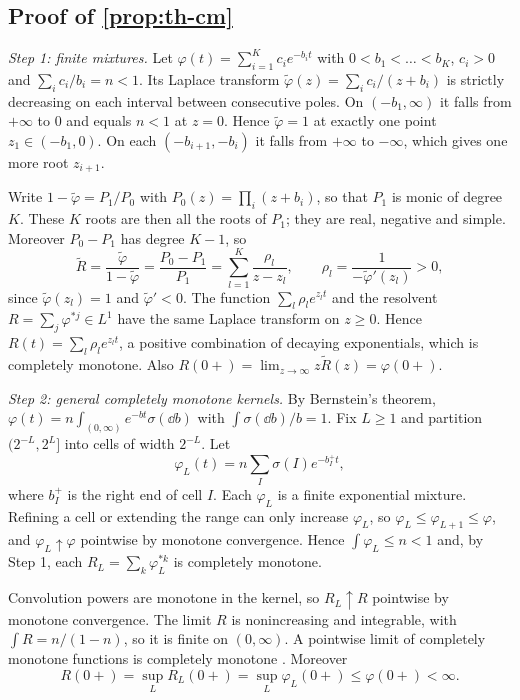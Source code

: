 \subsection{Proof of \texorpdfstring{\cref{prop:th-cm}}{Proposition (CM kernels)}}

\emph{Step 1: finite mixtures.} Let $\varphi(t)=\sum_{i=1}^Kc_ie^{-b_it}$ with
$0<b_1<\dots<b_K$, $c_i>0$ and $\sum_ic_i/b_i=n<1$. Its Laplace transform
$\tilde\varphi(z)=\sum_ic_i/(z+b_i)$ is strictly decreasing on each interval between
consecutive poles. On $(-b_1,\infty)$ it falls from $+\infty$ to $0$ and equals $n<1$
at $z=0$. Hence $\tilde\varphi=1$ at exactly one point $z_1\in(-b_1,0)$. On each
$(-b_{i+1},-b_i)$ it falls from $+\infty$ to $-\infty$, which gives one more root
$z_{i+1}$.

Write $1-\tilde\varphi=P_1/P_0$ with $P_0(z)=\prod_i(z+b_i)$, so that $P_1$ is monic of
degree $K$. These $K$ roots are then all the roots of $P_1$; they are real, negative and simple.
Moreover $P_0-P_1$ has degree $K-1$, so
\[
\tilde R=\frac{\tilde\varphi}{1-\tilde\varphi}=\frac{P_0-P_1}{P_1}
=\sum_{l=1}^K\frac{\rho_l}{z-z_l},\qquad
\rho_l=\frac{1}{-\tilde\varphi'(z_l)}>0,
\]
since $\tilde\varphi(z_l)=1$ and $\tilde\varphi'<0$. The function
$\sum_l\rho_le^{z_lt}$ and the resolvent $R=\sum_j\varphi^{*j}\in L^1$ have the same
Laplace transform on $z\ge0$. Hence $R(t)=\sum_l\rho_le^{z_lt}$, a positive combination of
decaying exponentials, which is completely monotone. Also
$R(0+)=\lim_{z\to\infty}z\tilde R(z)=\varphi(0+)$.

\emph{Step 2: general completely monotone kernels.} By Bernstein's theorem,
$\varphi(t)=n\int_{(0,\infty)}e^{-bt}\sigma(\dd b)$ with $\int\sigma(\dd b)/b=1$. Fix
$L\ge1$ and partition $(2^{-L},2^L]$ into cells of width $2^{-L}$. Let
\[
\varphi_L(t)=n\sum_I\sigma(I)e^{-b_I^+t},
\]
where $b_I^+$ is the right end of cell $I$. Each $\varphi_L$ is a finite exponential
mixture. Refining a cell or extending the range can only increase $\varphi_L$, so
$\varphi_L\le\varphi_{L+1}\le\varphi$, and $\varphi_L\uparrow\varphi$ pointwise by
monotone convergence. Hence $\int\varphi_L\le n<1$ and, by Step 1, each
$R_L=\sum_k\varphi_L^{*k}$ is completely monotone.

Convolution powers are monotone in the kernel, so $R_L\uparrow R$ pointwise by monotone
convergence. The limit $R$ is nonincreasing and integrable, with $\int R=n/(1-n)$, so it
is finite on $(0,\infty)$. A pointwise limit of completely monotone functions is
completely monotone \citep[Cor.~1.6]{schilling2012}. Moreover
\[
R(0+)=\sup_{L}R_L(0+)=\sup_{L}\varphi_L(0+)\le\varphi(0+)<\infty .
\]

